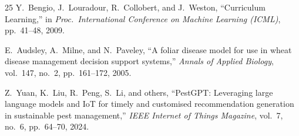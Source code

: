\documentclass[12pt,a4paper]{report}
\begin{document}
\begin{thebibliography}{25}
Y.~Bengio, J.~Louradour, R.~Collobert, and J.~Weston,
``Curriculum Learning,''
in \textit{Proc.\ International Conference on Machine Learning (ICML)}, pp.~41--48, 2009.

E.~Audsley, A.~Milne, and N.~Paveley,
``A foliar disease model for use in wheat disease management decision support systems,''
\textit{Annals of Applied Biology}, vol.~147, no.~2, pp.~161--172, 2005.

Z.~Yuan, K.~Liu, R.~Peng, S.~Li, and others,
``PestGPT: Leveraging large language models and IoT for timely and customised recommendation generation in sustainable pest management,''
\textit{IEEE Internet of Things Magazine}, vol.~7, no.~6, pp.~64--70, 2024.

\end{thebibliography}
\end{document}
